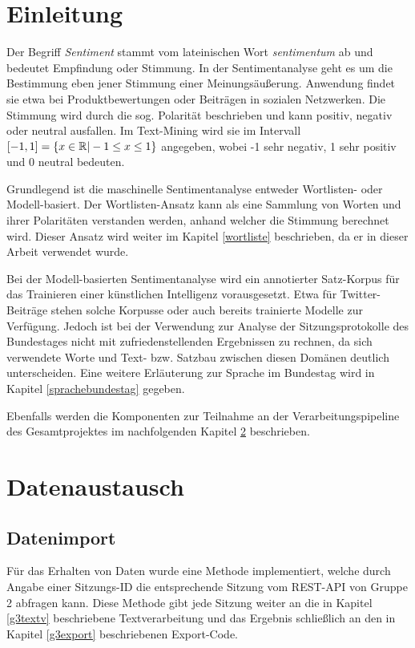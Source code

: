\section{Einleitung}
Der Begriff \textit{Sentiment} stammt vom lateinischen Wort \textit{sentimentum} ab und bedeutet Empfindung oder Stimmung. 
In der Sentimentanalyse geht es um die Bestimmung eben jener Stimmung einer Meinungsäußerung. 
Anwendung findet sie etwa bei Produktbewertungen oder Beiträgen in sozialen Netzwerken. 
Die Stimmung wird durch die sog. Polarität beschrieben und kann positiv, negativ oder neutral ausfallen. 
Im Text-Mining wird sie im Intervall $\interval{-1}{1} = \{x \in \mathbb{R} | -1 \leq x \leq 1\}$ angegeben, wobei -1 sehr negativ, 1 sehr positiv und 0 neutral bedeuten. 

Grundlegend ist die maschinelle Sentimentanalyse entweder Wortlisten- oder Modell-basiert. 
Der Wortlisten-Ansatz kann als eine Sammlung von Worten und ihrer Polaritäten verstanden werden, anhand welcher die Stimmung berechnet wird. 
Dieser Ansatz wird weiter im Kapitel \ref{wortliste} beschrieben, da er in dieser Arbeit verwendet wurde. 

Bei der Modell-basierten Sentimentanalyse wird ein annotierter Satz-Korpus für das Trainieren einer künstlichen Intelligenz vorausgesetzt. 
Etwa für Twitter-Beiträge stehen solche Korpusse oder auch bereits trainierte Modelle zur Verfügung. 
Jedoch ist bei der Verwendung zur Analyse der Sitzungsprotokolle des Bundestages nicht mit zufriedenstellenden Ergebnissen zu rechnen, da sich verwendete Worte und Text- bzw. Satzbau zwischen diesen Domänen deutlich unterscheiden. 
Eine weitere Erläuterung zur Sprache im Bundestag wird in Kapitel \ref{sprachebundestag} gegeben. 

Ebenfalls werden die Komponenten zur Teilnahme an der Verarbeitungspipeline des Gesamtprojektes im nachfolgenden Kapitel \ref{g3daten} beschrieben. 

\section{Datenaustausch}
\label{g3daten}
\subsection{Datenimport}
Für das Erhalten von Daten wurde eine Methode implementiert, welche durch Angabe einer Sitzungs-ID die entsprechende Sitzung vom REST-API von Gruppe 2 abfragen kann. 
Diese Methode gibt jede Sitzung weiter an die in Kapitel \ref{g3textv} beschriebene Textverarbeitung und das Ergebnis schließlich an den in Kapitel \ref{g3export} beschriebenen Export-Code. 

